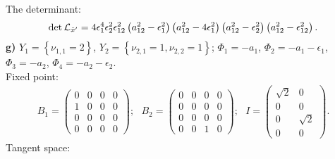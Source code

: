 \documentclass[a4paper,12pt]{article}
\begin{document}
The determinant:
\begin{eqnarray}
\det {\cal L}_{{\tilde x}'}=4\epsilon_1^4 \epsilon_2^2
\epsilon_{12}^2 \left(a_{12}^2-\epsilon_1^2
\right)\left(a_{12}^2-4\epsilon_1^2
\right)\left(a_{12}^2-\epsilon_2^2
\right)\left(a_{12}^2-\epsilon_{12}^2 \right).
\end{eqnarray}
{\bf g)} $Y_1=\left\{\nu_{1,1}=2 \right\}$,
$Y_2=\left\{\nu_{2,1}=1, \nu_{2,2}=1 \right\}$; $\Phi_1=-a_1$,
$\Phi_2=-a_1-\epsilon_1$,
$\Phi_3=-a_2$, $\Phi_4=-a_2-\epsilon_2$. \\
Fixed point:
\begin{eqnarray}
B_1=\left(\begin{array}{cccc} 0 & 0 & 0 & 0 \\ 1 & 0 & 0 & 0 \\ 0 & 0 & 0 & 0 \\
0 & 0 & 0 & 0
\end{array}\right); \, \, \, \,
B_2=\left(\begin{array}{cccc} 0 & 0 & 0 & 0 \\ 0 & 0 & 0 & 0 \\ 0 & 0 & 0 & 0 \\
0 & 0 & 1 & 0
\end{array}\right); \, \, \, \, I=\left(\begin{array}{cc} \sqrt{2} & 0 \\ 0 & 0 \\ 0 & \sqrt{2} \\0 & 0
\end{array}\right).
\end{eqnarray}
Tangent space:
\end{document}

